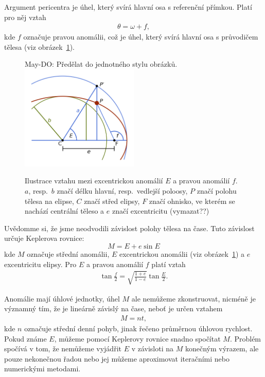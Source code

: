 \documentclass[A4paper, 12pt, oneside]{book}
\begin{document}
Argument pericentra je úhel, který svírá hlavní osa s referenční přímkou. Platí pro něj vztah
\begin{align}
	\theta=\omega+f,
\end{align}
kde $f$ označuje pravou anomálii, což je úhel, který svírá hlavní osa s průvodičem tělesa (viz obrázek~\ref{fig:E}).

\begin{figure}[!htb] 
	\centering
	May-DO: Předělat do jednotného stylu obrázků.
	\includegraphics[width=0.5\textwidth]{obr/Eanomaly.png}
	\caption{Ilustrace vztahu mezi excentrickou anomálií $E$ a pravou anomálií $f$. $a$, resp.\ $b$ značí délku hlavní, resp.\ vedlejší poloosy, $P$ značí polohu tělesa na elipse, $C$ značí střed elipsy, $F$ značí ohnisko, ve kterém se nachází centrální těleso a $e$ značí excentricitu (vymazat??)} \label{fig:E}
\end{figure}

Uvědomme si, že jsme neodvodili závislost polohy tělesa na čase. Tuto závislost určuje Keplerova rovnice:
\begin{equation} \label{eq:kepler}
M = E + e\sin E
\end{equation}
kde $M$ označuje střední anomálii, $E$ excentrickou anomálii (viz obrázek~\ref{fig:E}) a $e$ excentricitu elipsy. Pro $E$ a pravou anomálií $f$ platí vztah
\begin{align} \label {eq:fE}
	\tan \frac{f}{2} = \sqrt{\frac{1+e}{1-e}}\tan \frac{E}{2}.
\end{align}

Anomálie mají úhlové jednotky, úhel $M$ ale nemůžeme zkonstruovat, nicméně je významný tím, že je lineárně závislý na čase, neboť je určen vztahem 
\begin{align} \label{eq:M}
	M=nt,
\end{align}
kde $n$ označuje střední denní pohyb, jinak řečeno průměrnou úhlovou rychlost. Pokud známe $E$, můžeme pomocí Keplerovy rovnice snadno spočítat $M$. Problém spočívá v tom, že nemůžeme vyjádřit $E$ v závisloti na $M$ konečným výrazem, ale pouze nekonečnou řadou nebo jej můžeme aproximovat iteračními nebo numerickými metodami.
\end{document}
